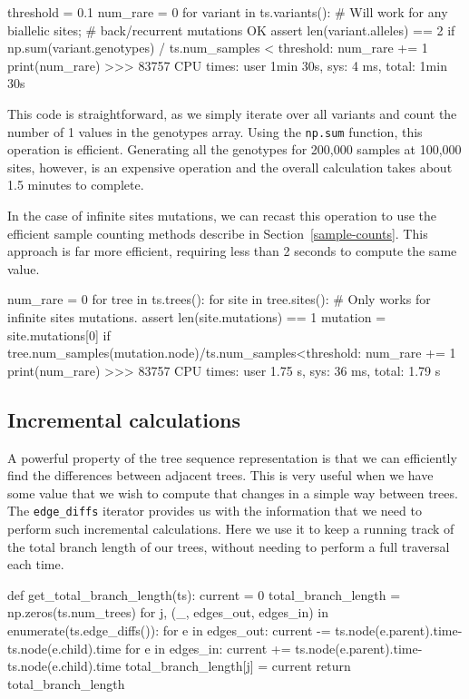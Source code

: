 \documentclass[graybox]{svmult}
\begin{document}
\begin{pythoncode}
threshold = 0.1
num_rare = 0
for variant in ts.variants():
    # Will work for any biallelic sites;
    # back/recurrent mutations OK
    assert len(variant.alleles) == 2
    if np.sum(variant.genotypes) / ts.num_samples < threshold:
        num_rare += 1
print(num_rare)
>>> 83757
CPU times: user 1min 30s, sys: 4 ms, total: 1min 30s
\end{pythoncode}

This code is straightforward, as we simply iterate over all variants and
count the number of 1 values in the genotypes array. Using the \texttt{np.sum}
function, this operation is efficient. Generating all the genotypes for
200,000 samples at 100,000 sites, however,
is an expensive operation and the overall calculation takes about 1.5 minutes
to complete.

In the case of infinite sites mutations, we can recast this operation
to use the efficient sample counting methods describe in
Section~\ref{sample-counts}. This approach is far more
efficient, requiring less than 2 seconds to compute the same value.
\begin{pythoncode}
num_rare = 0
for tree in ts.trees():
  for site in tree.sites():
    # Only works for infinite sites mutations.
    assert len(site.mutations) == 1
    mutation = site.mutations[0]
    if tree.num_samples(mutation.node)/ts.num_samples<threshold:
        num_rare += 1
print(num_rare)
>>> 83757
CPU times: user 1.75 s, sys: 36 ms, total: 1.79 s
\end{pythoncode}

\subsection{Incremental calculations}\label{incremental-calculations}

A powerful property of the tree sequence representation is that we can
efficiently find the differences between adjacent trees. This is very
useful when we have some value that we wish to compute that changes in a
simple way between trees. The \texttt{edge\_diffs} iterator provides us
with the information that we need to perform such incremental
calculations. Here we use it to keep a running track of the total branch
length of our trees, without needing to perform a full traversal each
time.

\begin{pythoncode}
def get_total_branch_length(ts):
  current = 0
  total_branch_length = np.zeros(ts.num_trees)
  for j, (_, edges_out, edges_in) in enumerate(ts.edge_diffs()):
    for e in edges_out:
        current -= ts.node(e.parent).time-ts.node(e.child).time
    for e in edges_in:
        current += ts.node(e.parent).time-ts.node(e.child).time
    total_branch_length[j] = current
  return total_branch_length
\end{pythoncode}
\end{document}
